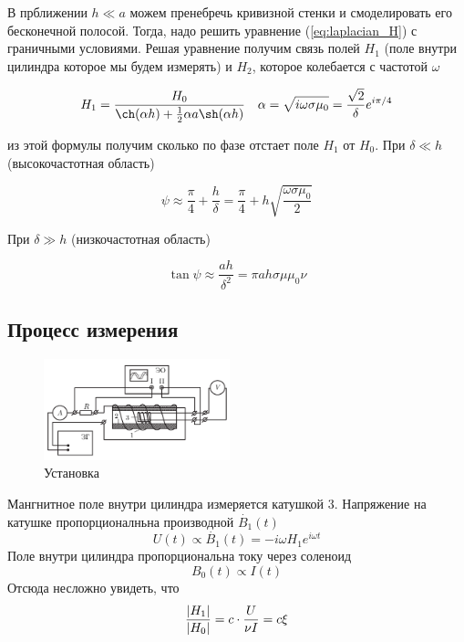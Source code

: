 \documentclass[a4paper,12pt]{article}
\begin{document}
В прближении $h \ll a$ можем пренебречь кривизной стенки и смоделировать 
его бесконечной полосой. Тогда, надо решить уравнение (\ref{eq:laplacian_H})
с граничными условиями. Решая уравнение получим связь полей $H_1$ 
(поле внутри цилиндра которое мы будем измерять) и $H_2$, которое колебается с частотой
$\omega$

\begin{equation}
    H_1 = \frac{H_0}{\ch(\alpha h) + \frac{1}{2} \alpha a \sh(\alpha h)} 
    \text{\ \ \ }
    \alpha = \sqrt{i\omega \sigma \mu_0} = \frac{\sqrt{2}}{\delta}e^{i\pi/4}
    \label{eq:svyaz_poley}
\end{equation}

из этой формулы получим сколько по фазе отстает поле $H_1$ от $H_0$. При $\delta \ll h$
(высокочастотная область)

\begin{equation}
    \psi \approx \frac{\pi}{4} + \frac{h}{\delta} = 
    \frac{\pi}{4} + h \sqrt{\frac{\omega \sigma \mu_0}{2}}
    \label{eq:faza_high_freq}
\end{equation}

При $\delta \gg h$ (низкочастотная область)

\begin{equation}
    \tan \psi \approx \frac{ah}{\delta^2} = \pi a h \sigma \mu \mu_0 \nu
    \label{eq:faza_low_freq}
\end{equation}
\newpage

\subsection{Процесс измерения}
\begin{figure}
  \begin{center}
    \includegraphics[width=0.48\textwidth]{ustanovka}
  \end{center}
  \caption{Установка}\label{fig:ustanovka}
\end{figure}

Мангнитное поле внутри цилиндра измеряется катушкой 3. Напряжение на катушке
пропорционалньна производной $\dot{B_1}(t)$
\begin{equation*}
    U(t) \propto \dot{B_1}(t) = -i\omega H_1 e^{i\omega t}
\end{equation*}
Поле внутри цилиндра пропорциональна току через соленоид
\begin{equation*}
    B_0(t) \propto I(t)
\end{equation*}
Отсюда несложно увидеть, что
\begin{equation}
    \frac{\abs{H_1}}{\abs{H_0}} = c \cdot \frac{U}{\nu I} = c \xi
    \label{eq:otnoshenie_amplitud}
\end{equation}
\vspace{0.3cm}
\end{document}
